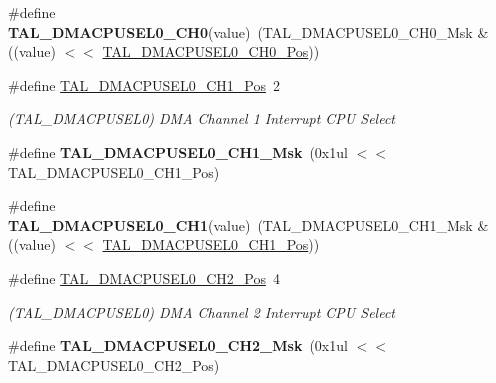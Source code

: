 \begin{DoxyCompactItemize}
\item 
\hypertarget{group___s_a_m_l21___t_a_l_ga154db6c29a0d739b482027d1f2a42861}{}\#define {\bfseries T\+A\+L\+\_\+\+D\+M\+A\+C\+P\+U\+S\+E\+L0\+\_\+\+C\+H0}(value)~(T\+A\+L\+\_\+\+D\+M\+A\+C\+P\+U\+S\+E\+L0\+\_\+\+C\+H0\+\_\+\+Msk \& ((value) $<$$<$ \hyperlink{group___s_a_m_l21___t_a_l_ga5c01cb096f932f081b238dc2869e3fd4}{T\+A\+L\+\_\+\+D\+M\+A\+C\+P\+U\+S\+E\+L0\+\_\+\+C\+H0\+\_\+\+Pos}))\label{group___s_a_m_l21___t_a_l_ga154db6c29a0d739b482027d1f2a42861}

\item 
\hypertarget{group___s_a_m_l21___t_a_l_gad98296e3fe7ec42b261c90ae14afe4d9}{}\#define \hyperlink{group___s_a_m_l21___t_a_l_gad98296e3fe7ec42b261c90ae14afe4d9}{T\+A\+L\+\_\+\+D\+M\+A\+C\+P\+U\+S\+E\+L0\+\_\+\+C\+H1\+\_\+\+Pos}~2\label{group___s_a_m_l21___t_a_l_gad98296e3fe7ec42b261c90ae14afe4d9}

\begin{DoxyCompactList}\small\item\em (T\+A\+L\+\_\+\+D\+M\+A\+C\+P\+U\+S\+E\+L0) D\+M\+A Channel 1 Interrupt C\+P\+U Select \end{DoxyCompactList}\item 
\hypertarget{group___s_a_m_l21___t_a_l_gad617ee3c23ab07a0ee37a92805d01446}{}\#define {\bfseries T\+A\+L\+\_\+\+D\+M\+A\+C\+P\+U\+S\+E\+L0\+\_\+\+C\+H1\+\_\+\+Msk}~(0x1ul $<$$<$ T\+A\+L\+\_\+\+D\+M\+A\+C\+P\+U\+S\+E\+L0\+\_\+\+C\+H1\+\_\+\+Pos)\label{group___s_a_m_l21___t_a_l_gad617ee3c23ab07a0ee37a92805d01446}

\item 
\hypertarget{group___s_a_m_l21___t_a_l_ga5cb8fd53a1e52e25090bae9d4191c3d4}{}\#define {\bfseries T\+A\+L\+\_\+\+D\+M\+A\+C\+P\+U\+S\+E\+L0\+\_\+\+C\+H1}(value)~(T\+A\+L\+\_\+\+D\+M\+A\+C\+P\+U\+S\+E\+L0\+\_\+\+C\+H1\+\_\+\+Msk \& ((value) $<$$<$ \hyperlink{group___s_a_m_l21___t_a_l_gad98296e3fe7ec42b261c90ae14afe4d9}{T\+A\+L\+\_\+\+D\+M\+A\+C\+P\+U\+S\+E\+L0\+\_\+\+C\+H1\+\_\+\+Pos}))\label{group___s_a_m_l21___t_a_l_ga5cb8fd53a1e52e25090bae9d4191c3d4}

\item 
\hypertarget{group___s_a_m_l21___t_a_l_ga7622e9b30020f338416fd58190beae64}{}\#define \hyperlink{group___s_a_m_l21___t_a_l_ga7622e9b30020f338416fd58190beae64}{T\+A\+L\+\_\+\+D\+M\+A\+C\+P\+U\+S\+E\+L0\+\_\+\+C\+H2\+\_\+\+Pos}~4\label{group___s_a_m_l21___t_a_l_ga7622e9b30020f338416fd58190beae64}

\begin{DoxyCompactList}\small\item\em (T\+A\+L\+\_\+\+D\+M\+A\+C\+P\+U\+S\+E\+L0) D\+M\+A Channel 2 Interrupt C\+P\+U Select \end{DoxyCompactList}\item 
\hypertarget{group___s_a_m_l21___t_a_l_ga8e3528d0824f9f8f60e7ca1e48a5c2be}{}\#define {\bfseries T\+A\+L\+\_\+\+D\+M\+A\+C\+P\+U\+S\+E\+L0\+\_\+\+C\+H2\+\_\+\+Msk}~(0x1ul $<$$<$ T\+A\+L\+\_\+\+D\+M\+A\+C\+P\+U\+S\+E\+L0\+\_\+\+C\+H2\+\_\+\+Pos)\label{group___s_a_m_l21___t_a_l_ga8e3528d0824f9f8f60e7ca1e48a5c2be}


\end{DoxyCompactItemize}
